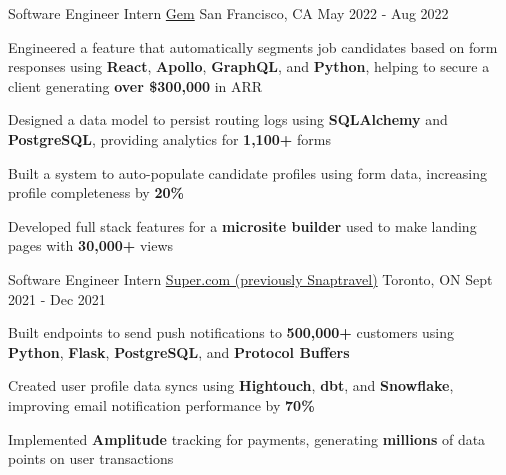 \begin{cventries}
  \cventry
    {Software Engineer Intern} %
    {\href{https://www.gem.com/}{Gem}} %
    {San Francisco, CA} %
    {May 2022 - Aug 2022} %
    {
      \begin{cvitems} %
      \item {Engineered a feature that automatically segments job candidates based on form responses using \textbf{React}, \textbf{Apollo}, \textbf{GraphQL}, and \textbf{Python}, helping to secure a client generating \textbf{over \$300,000} in ARR}
      \item {Designed a data model to persist routing logs using \textbf{SQLAlchemy} and \textbf{PostgreSQL}}, providing analytics for \textbf{1,100+} forms
      \item {Built a system to auto-populate candidate profiles using form data, increasing profile completeness by \textbf{20\%}}
      \item {Developed full stack features for a \textbf{microsite builder} used to make landing pages with \textbf{30,000+} views}
      \end{cvitems}
    }

  \cventry
    {Software Engineer Intern} %
    {\href{https://www.super.com/}{Super.com (previously Snaptravel)}} %
    {Toronto, ON} %
    {Sept 2021 - Dec 2021} %
    {
      \begin{cvitems} %
      \item {Built endpoints to send push notifications to \textbf{500,000+} customers using \textbf{Python}, \textbf{Flask}, \textbf{PostgreSQL}, and \textbf{Protocol Buffers}}
      \item {Created user profile data syncs using \textbf{Hightouch}, \textbf{dbt}, and \textbf{Snowflake}, improving email notification performance by \textbf{70\%}}
      \item {Implemented \textbf{Amplitude} tracking for payments, generating \textbf{millions} of data points on user transactions}
      \end{cvitems}
    }


\end{cventries}
